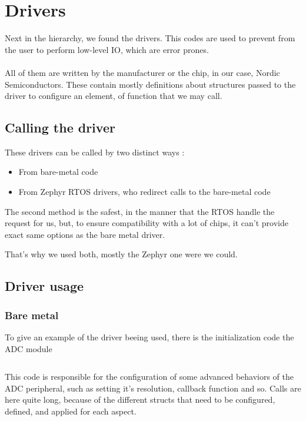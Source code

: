 \section{Drivers}
Next in the hierarchy, we found the drivers. This codes are used to prevent
from the user to perform low-level IO, which are error prones.

\paragraph{}
All of them are written by the manufacturer or the chip, in our case, Nordic
Semiconductors. These contain mostly definitions about structures passed to the
driver to configure an element, of function that we may call.

\subsection{Calling the driver}
These drivers can be called by two distinct ways :
\begin{itemize}
    \item From bare-metal code
    \item From Zephyr RTOS drivers, who redirect calls to the bare-metal code
\end{itemize}

The second method is the safest, in the manner that the RTOS handle the request
for us, but, to ensure compatibility with a lot of chips, it can't provide
exact same options as the bare metal driver.

That's why we used both, mostly the Zephyr one were we could.

\subsection{Driver usage}
\subsubsection{Bare metal}
To give an example of the driver beeing used, there is the initialization code
the ADC module

\inputminted[linenos, firstline=103, lastline=112]{cpp}{\Code/peripherals/saadc/saadc.cpp}

This code is responsible for the configuration of some advanced behaviors of
the ADC peripheral, such as setting it's resolution, callback function and so.
Calls are here quite long, because of the different structs that need to be
configured, defined, and applied for each aspect.

